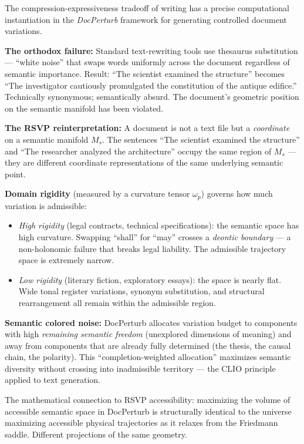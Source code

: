 \begin{tcolorbox}[enhanced, breakable,
  colback=RSVPgray, colframe=RSVPdeep, arc=4pt, boxrule=0.6pt,
  title={\bfseries\sffamily Worked Example: DocPerturb and Semantic Colored Noise},
  coltitle=white, attach boxed title to top left={yshift=-2mm,xshift=6mm},
  boxed title style={colback=RSVPdeep,sharp corners},
  top=4mm,left=4mm,right=4mm,bottom=4mm]

The compression-expressiveness tradeoff of writing has a precise
computational instantiation in the \emph{DocPerturb} framework for
generating controlled document variations.

\textbf{The orthodox failure:} Standard text-rewriting tools use
thesaurus substitution — ``white noise'' that swaps words uniformly
across the document regardless of semantic importance. Result:
``The scientist examined the structure'' becomes ``The investigator
cautiously promulgated the constitution of the antique edifice.''
Technically synonymous; semantically absurd. The document's geometric
position on the semantic manifold has been violated.

\textbf{The RSVP reinterpretation:} A document is not a text file
but a \emph{coordinate} on a semantic manifold $M_s$. The sentences
``The scientist examined the structure'' and ``The researcher analyzed
the architecture'' occupy the same region of $M_s$ — they are
different coordinate representations of the same underlying semantic point.

\textbf{Domain rigidity} (measured by a curvature tensor $\omega_p$)
governs how much variation is admissible:
\begin{itemize}
  \item \emph{High rigidity} (legal contracts, technical specifications):
        the semantic space has high curvature. Swapping ``shall'' for
        ``may'' crosses a \emph{deontic boundary} — a non-holonomic failure
        that breaks legal liability. The admissible trajectory space
        is extremely narrow.
  \item \emph{Low rigidity} (literary fiction, exploratory essays):
        the space is nearly flat. Wide tonal register variations,
        synonym substitution, and structural rearrangement all remain
        within the admissible region.
\end{itemize}

\textbf{Semantic colored noise:} DocPerturb allocates variation budget
to components with high \emph{remaining semantic freedom} (unexplored
dimensions of meaning) and away from components that are already
fully determined (the thesis, the causal chain, the polarity).
This ``completion-weighted allocation'' maximizes semantic diversity
without crossing into inadmissible territory — the CLIO principle
applied to text generation.

The mathematical connection to RSVP accessibility: maximizing the
volume of accessible semantic space in DocPerturb is structurally
identical to the universe maximizing accessible physical trajectories
as it relaxes from the Friedmann saddle. Different projections of the
same geometry.
\end{tcolorbox}


